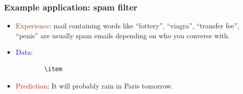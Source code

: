 \documentclass[9pt]{beamer}
\begin{document}
\begin{frame}
  \frametitle{Example application: spam filter}

  \begin{itemize}
    \item \textcolor{brown}{Experience}: mail containing words like
      ``lottery'', ``viagra'', ``transfer fee'', ``penis'' are usually
      spam emails depending on who you converse with.
    \item \textcolor{blue}{Data}:
      \begin{verbatim}
        \item
      \end{verbatim}
    \item \textcolor{red}{Prediction}: It will probably rain in Paris tomorrow.
  \end{itemize}

\end{frame}
\end{document}
